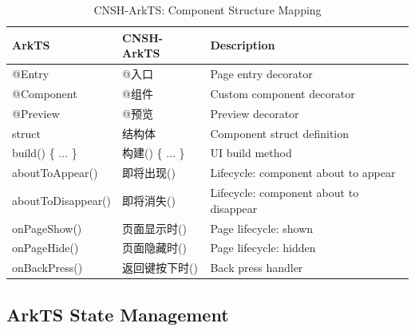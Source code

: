 \begin{table}[h]
\centering
\caption{CNSH-ArkTS: Component Structure Mapping}
\renewcommand{\arraystretch}{1.3}
\begin{tabular}{llp{5cm}}
\toprule
\textbf{ArkTS} & \textbf{CNSH-ArkTS} & \textbf{Description} \\
\midrule
@Entry & @入口 & Page entry decorator \\
@Component & @组件 & Custom component decorator \\
@Preview & @预览 & Preview decorator \\
struct & 结构体 & Component struct definition \\
build() \{ ... \} & 构建() \{ ... \} & UI build method \\
aboutToAppear() & 即将出现() & Lifecycle: component about to appear \\
aboutToDisappear() & 即将消失() & Lifecycle: component about to disappear \\
onPageShow() & 页面显示时() & Page lifecycle: shown \\
onPageHide() & 页面隐藏时() & Page lifecycle: hidden \\
onBackPress() & 返回键按下时() & Back press handler \\
\bottomrule
\end{tabular}
\end{table}

\subsection{ArkTS State Management}

